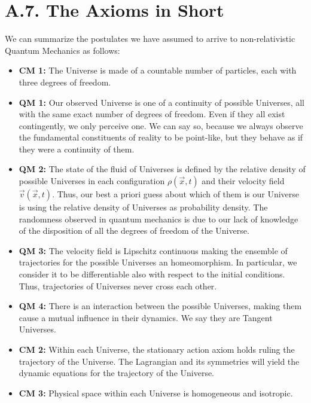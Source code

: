 \documentclass[11pt, a4paper]{article} %
\begin{document}
\newpage
{}
\section*{A.7. The Axioms in Short}
We can summarize the postulates we have assumed to arrive to non-relativistic Quantum Mechanics as follows:
\begin{itemize}
\item {\bf CM 1:} The Universe is made of a countable number of particles, each with three degrees of freedom.

\item {\bf QM 1:} Our observed Universe is one of a continuity of possible Universes, all with the same exact number of degrees of freedom. Even if they all exist contingently, we only perceive one. We can say so, because we always observe the fundamental constituents of reality to be point-like, but they behave as if they were a continuity of them.

\item {\bf QM 2:} The state of the fluid of Universes is defined by the relative density of possible Universes in each configuration $\rho(\vec{x},t)$ and their velocity field $\vec{v}(\vec{x},t)$. Thus, our best a priori guess about which of them is our Universe is using the relative density of Universes as probability density. The randomness observed in quantum mechanics is due to our lack of knowledge of the disposition of all the degrees of freedom of the Universe.

\item {\bf QM 3:} The velocity field is Lipschitz continuous making the ensemble of trajectories for the possible Universes an homeomorphism. In particular, we consider it to be differentiable also with respect to the initial conditions. Thus, trajectories of Universes never cross each other.

\item {\bf QM 4:} There is an interaction between the possible Universes, making them cause a mutual influence in their dynamics. We say they are Tangent Universes.

\item {\bf CM 2:} Within each Universe, the stationary action axiom holds ruling the trajectory of the Universe. The Lagrangian and its symmetries will yield the dynamic equations for the trajectory of the Universe.

\item {\bf CM 3:} Physical space within each Universe is homogeneous and isotropic.


\end{itemize}
\end{document}
